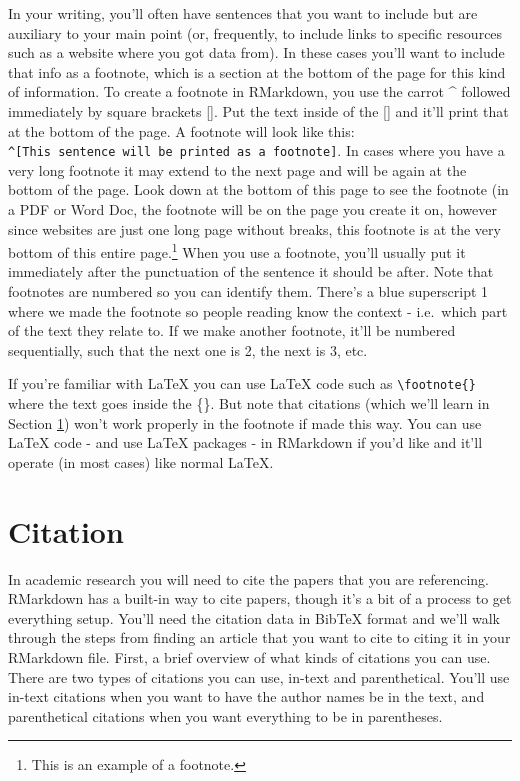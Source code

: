 \documentclass[
]{krantz}
\begin{document}
In your writing, you'll often have sentences that you want to include but are auxiliary to your main point (or, frequently, to include links to specific resources such as a website where you got data from). In these cases you'll want to include that info as a footnote, which is a section at the bottom of the page for this kind of information. To create a footnote in RMarkdown, you use the carrot \^{} followed immediately by square brackets {[}{]}. Put the text inside of the {[}{]} and it'll print that at the bottom of the page. A footnote will look like this: \texttt{\^{}{[}This\ sentence\ will\ be\ printed\ as\ a\ footnote{]}}. In cases where you have a very long footnote it may extend to the next page and will be again at the bottom of the page. Look down at the bottom of this page to see the footnote (in a PDF or Word Doc, the footnote will be on the page you create it on, however since websites are just one long page without breaks, this footnote is at the very bottom of this entire page.\footnote{This is an example of a footnote.} When you use a footnote, you'll usually put it immediately after the punctuation of the sentence it should be after. Note that footnotes are numbered so you can identify them. There's a blue superscript 1 where we made the footnote so people reading know the context - i.e.~which part of the text they relate to. If we make another footnote, it'll be numbered sequentially, such that the next one is 2, the next is 3, etc.

If you're familiar with LaTeX you can use LaTeX code such as \texttt{\textbackslash{}footnote\{\}} where the text goes inside the \{\}. But note that citations (which we'll learn in Section \ref{citation}) won't work properly in the footnote if made this way. You can use LaTeX code - and use LaTeX packages - in RMarkdown if you'd like and it'll operate (in most cases) like normal LaTeX.

\hypertarget{citation}{%
\section{Citation}\label{citation}}

In academic research you will need to cite the papers that you are referencing. RMarkdown has a built-in way to cite papers, though it's a bit of a process to get everything setup. You'll need the citation data in BibTeX format and we'll walk through the steps from finding an article that you want to cite to citing it in your RMarkdown file. First, a brief overview of what kinds of citations you can use. There are two types of citations you can use, in-text and parenthetical. You'll use in-text citations when you want to have the author names be in the text, and parenthetical citations when you want everything to be in parentheses.
\end{document}
